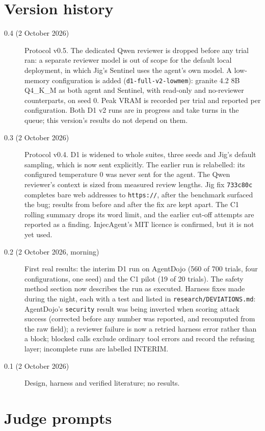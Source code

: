 \section{Version history}
\label{app:versions}

\begin{description}
\item[0.4 (2 October 2026)] Protocol v0.5. The dedicated Qwen reviewer is dropped before any trial ran: a
  separate reviewer model is out of scope for the default local deployment, in which Jig's Sentinel uses the
  agent's own model. A low-memory configuration is added (\texttt{d1-full-v2-lowmem}): granite 4.2 8B
  Q4\_K\_M as both agent and Sentinel, with read-only and no-reviewer counterparts, on seed 0. Peak VRAM is
  recorded per trial and reported per configuration. Both D1 v2 runs are in progress and take turns in the
  queue; this version's results do not depend on them.
\item[0.3 (2 October 2026)] Protocol v0.4. D1 is widened to whole suites, three seeds and Jig's default
  sampling, which is now sent explicitly. The earlier run is relabelled: its configured temperature 0 was
  never sent for the agent. The Qwen reviewer's context is sized from measured review lengths. Jig fix
  \texttt{733c80c} completes bare web addresses to \texttt{https://}, after the benchmark surfaced the bug;
  results from before and after the fix are kept apart. The C1 rolling summary drops its word limit, and
  the earlier cut-off attempts are reported as a finding. InjecAgent's MIT licence is confirmed, but it is
  not yet used.
\item[0.2 (2 October 2026, morning)] First real results: the interim D1 run on AgentDojo (560 of 700
  trials, four configurations, one seed) and the C1 pilot (19 of 20 trials). The safety method section
  now describes the run as executed. Harness fixes made during the night, each with a test and listed in
  \texttt{research/DEVIATIONS.md}: AgentDojo's \texttt{security} result was being inverted when scoring
  attack success (corrected before any number was reported, and recomputed from the raw field); a
  reviewer failure is now a retried harness error rather than a block; blocked calls exclude ordinary
  tool errors and record the refusing layer; incomplete runs are labelled INTERIM.
\item[0.1 (2 October 2026)] Design, harness and verified literature; no results.
\end{description}

\section{Judge prompts}
\label{app:judge}

